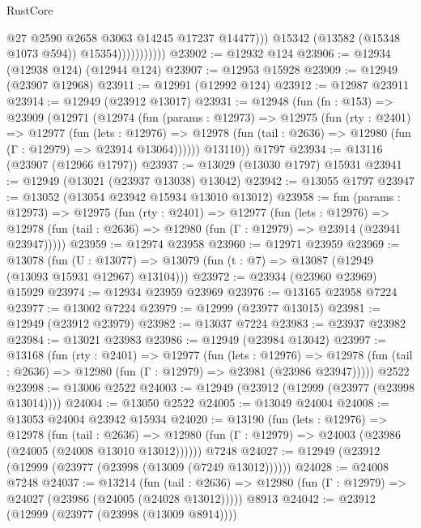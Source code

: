 \begin{lexlean}{RustCore}
\begin{coremodule}
                                @27
                                @2590
                                @2658
                                @3063
                                @14245
                                @17237
                                @14477)))
                          @15342
                          (@13582 (@15348 @1073 @594))
                          @15354)))))))))))
@23902 := @12932 @124
@23906 := @12934 (@12938 @124) (@12944 @124)
@23907 := @12953 @15928
@23909 := @12949 (@23907 @12968)
@23911 := @12991 (@12992 @124)
@23912 := @12987 @23911
@23914 := @12949 (@23912 @13017)
@23931 := @12948
    (fun (fn : @153) =>
    @23909
      (@12971
        (@12974
          (fun (params : @12973) =>
          @12975
            (fun (rty : @2401) =>
            @12977
              (fun (lets : @12976) =>
              @12978 (fun (tail : @2636) => @12980 (fun (Γ : @12979) => @23914 @13064))))))
        @13110))
    @1797
@23934 := @13116 (@23907 (@12966 @1797))
@23937 := @13029 (@13030 @1797) @15931
@23941 := @12949 (@13021 (@23937 @13038) @13042)
@23942 := @13055 @1797
@23947 := @13052 (@13054 @23942 @15934 @13010 @13012)
@23958 := fun (params : @12973) =>
  @12975
    (fun (rty : @2401) =>
    @12977
      (fun (lets : @12976) =>
      @12978 (fun (tail : @2636) => @12980 (fun (Γ : @12979) => @23914 (@23941 @23947)))))
@23959 := @12974 @23958
@23960 := @12971 @23959
@23969 := @13078
    (fun (U : @13077) => @13079 (fun (t : @7) => @13087 (@12949 (@13093 @15931 @12967) @13104)))
@23972 := @23934 (@23960 @23969) @15929
@23974 := @12934 @23959 @23969
@23976 := @13165 @23958 @7224
@23977 := @13002 @7224
@23979 := @12999 (@23977 @13015)
@23981 := @12949 (@23912 @23979)
@23982 := @13037 @7224
@23983 := @23937 @23982
@23984 := @13021 @23983
@23986 := @12949 (@23984 @13042)
@23997 := @13168
    (fun (rty : @2401) =>
    @12977
      (fun (lets : @12976) =>
      @12978 (fun (tail : @2636) => @12980 (fun (Γ : @12979) => @23981 (@23986 @23947)))))
    @2522
@23998 := @13006 @2522
@24003 := @12949 (@23912 (@12999 (@23977 (@23998 @13014))))
@24004 := @13050 @2522
@24005 := @13049 @24004
@24008 := @13053 @24004 @23942 @15934
@24020 := @13190
    (fun (lets : @12976) =>
    @12978
      (fun (tail : @2636) =>
      @12980 (fun (Γ : @12979) => @24003 (@23986 (@24005 (@24008 @13010 @13012))))))
    @7248
@24027 := @12949 (@23912 (@12999 (@23977 (@23998 (@13009 (@7249 @13012))))))
@24028 := @24008 @7248
@24037 := @13214
    (fun (tail : @2636) => @12980 (fun (Γ : @12979) => @24027 (@23986 (@24005 (@24028 @13012)))))
    @8913
@24042 := @23912 (@12999 (@23977 (@23998 (@13009 @8914))))

\end{coremodule}
\end{lexlean}

